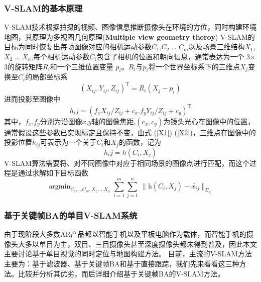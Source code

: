 \documentclass[14pt]{article}
\begin{document}
\subsubsection{V-SLAM的基本原理}
V-SLAM技术根据拍摄的视频、图像信息推断摄像头在环境的方位，同时构建环境地图，其原理为多视图几何原理(\textbf{Multiple view geometry theroy}) V-SLAM的目标为同时恢复出每帧图像对应的相机运动参数$C_1$,$C_2$ … $C_m$以及场景三维结构$X_1$,$X_2$ … $X_n$,每个相机运动参数$C_i$包含了相机的位置和朝向信息，通常表达为一个 3$\times$3的旋转矩阵$R_i$和一个三维位置变量 $p_i$。$R_i$与$p_i$将一个世界坐标系下的三维点$X_j$变换至$C_i$的局部坐标系
\begin{equation} \label{X1}
{(X_{ij},Y_{ij},Z_{ij})}^\mathrm{T}=R_{i}(X_{j}-p_{i})
\end{equation}
进而投影至图像中
\begin{equation} \label{X2}
h_ij={(f_{x}X_{ij}/Z_{ij}+c_{x}.f_{y}Y_{ij}/Z_{ij}+c_{y})}^\mathrm{T}
\end{equation}
其中，$f_x$,$f_y$分别为沿图像$x$,$y$轴的图像焦距,$(c_x,c_y)$为镜头光心在图像中的位置，通常假设这些参数已实现标定且保持不变，由式
(\ref{X1}) (\ref{X2})，三维点在图像中的投影位置$h_{ij}$可表示为一个关于$C_i$和$X_j$的函数，记为
\begin{equation}
h_ij=h(C_i,X_j)
\end{equation}
V-SLAM算法需要将、对不同图像中对应于相同场景的图像点进行匹配，而这个过程是通过求解如下目标函数
\begin{equation}
\mathop{\arg\min}_{C_1,…C_m,X_1,…X_n} \sum_{i=1}^{m} {\sum_{j=1}^{n} \ \| \mathrm{h} (C_i,X_j)-\tilde{x_{ij}}\|_{\Sigma_{ij}}}
\end{equation}

\subsubsection{基于关键帧BA的单目V-SLAM系统}
由于现阶段大多数AR产品都以智能手机以及平板电脑作为载体，而智能手机的摄像头大多以单目为主，双目、三目摄像头甚至深度摄像头都未得到普及，因此本文主要讨论基于单目视觉的同时定位与地图构建方法。
目前，主流的V-SLAM方法主要为：基于滤波器、基于关键帧BA和基于直接跟踪，我们先来看看这三种方法。比较并分析其优劣，而后详细介绍基于关键帧BA的V-SLAM方法。
\end{document}
